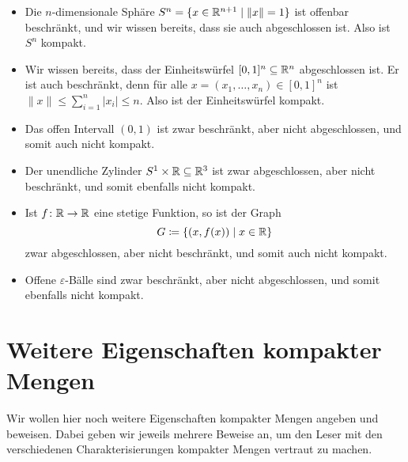 \documentclass[a4paper,10pt]{article}
\begin{document}
\begin{bsp}
 \begin{itemize}
  \item
   Die $n$-dimensionale Sphäre $S^n = \{x \in \mathbb{R}^{n+1} \mid \|x\| = 1\}$ ist offenbar beschränkt, und wir wissen bereits, dass sie auch abgeschlossen ist. Also ist $S^n$ kompakt.
  \item
   Wir wissen bereits, dass der Einheitswürfel $[0,1]^n \subseteq \mathbb{R}^n$ abgeschlossen ist. Er ist auch beschränkt, denn für alle $x = (x_1, \dotsc, x_n) \in [0,1]^n$ ist $\|x\| \leq \sum_{i=1}^n |x_i| \leq n$. Also ist der Einheitswürfel kompakt.
  \item
   Das offen Intervall $(0,1)$ ist zwar beschränkt, aber nicht abgeschlossen, und somit auch nicht kompakt.
  \item
   Der unendliche Zylinder $S^1 \times \mathbb{R} \subseteq \mathbb{R}^3$ ist zwar abgeschlossen, aber nicht beschränkt, und somit ebenfalls nicht kompakt.
  \item
   Ist $f \colon \mathbb{R} \to \mathbb{R}$ eine stetige Funktion, so ist der Graph
   \[
    G \coloneqq \{(x,f(x)) \mid x \in \mathbb{R}\}
   \]
   zwar abgeschlossen, aber nicht beschränkt, und somit auch nicht kompakt.
  \item
   Offene $\varepsilon$-Bälle sind zwar beschränkt, aber nicht abgeschlossen, und somit ebenfalls nicht kompakt.
  \end{itemize}
\end{bsp}





\section{Weitere Eigenschaften kompakter Mengen}
Wir wollen hier noch weitere Eigenschaften kompakter Mengen angeben und beweisen. Dabei geben wir jeweils mehrere Beweise an, um den Leser mit den verschiedenen Charakterisierungen kompakter Mengen vertraut zu machen.
\end{document}
